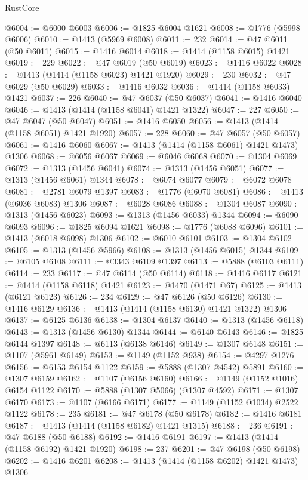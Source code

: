 \begin{lexlean}{RustCore}
\begin{coremodule}
@6004 := @6000 @6003
@6006 := @1825 @6004 @1621
@6008 := @1776 (@5998 @6006)
@6010 := @1413 (@5969 @6008)
@6011 := 232
@6014 := @47 @6011 (@50 @6011)
@6015 := @1416 @6014
@6018 := @1414 (@1158 @6015) @1421
@6019 := 229
@6022 := @47 @6019 (@50 @6019)
@6023 := @1416 @6022
@6028 := @1413 (@1414 (@1158 @6023) @1421 @1920)
@6029 := 230
@6032 := @47 @6029 (@50 @6029)
@6033 := @1416 @6032
@6036 := @1414 (@1158 @6033) @1421
@6037 := 226
@6040 := @47 @6037 (@50 @6037)
@6041 := @1416 @6040
@6046 := @1413 (@1414 (@1158 @6041) @1421 @1322)
@6047 := 227
@6050 := @47 @6047 (@50 @6047)
@6051 := @1416 @6050
@6056 := @1413 (@1414 (@1158 @6051) @1421 @1920)
@6057 := 228
@6060 := @47 @6057 (@50 @6057)
@6061 := @1416 @6060
@6067 := @1413 (@1414 (@1158 @6061) @1421 @1473) @1306
@6068 := @6056 @6067
@6069 := @6046 @6068
@6070 := @1304 @6069
@6072 := @1313 (@1456 @6041)
@6074 := @1313 (@1456 @6051)
@6077 := @1313 (@1456 @6061) @1344
@6078 := @6074 @6077
@6079 := @6072 @6078
@6081 := @2781 @6079 @1397
@6083 := @1776 (@6070 @6081)
@6086 := @1413 (@6036 @6083) @1306
@6087 := @6028 @6086
@6088 := @1304 @6087
@6090 := @1313 (@1456 @6023)
@6093 := @1313 (@1456 @6033) @1344
@6094 := @6090 @6093
@6096 := @1825 @6094 @1621
@6098 := @1776 (@6088 @6096)
@6101 := @1413 (@6018 @6098) @1306
@6102 := @6010 @6101
@6103 := @1304 @6102
@6105 := @1313 (@1456 @5966)
@6108 := @1313 (@1456 @6015) @1344
@6109 := @6105 @6108
@6111 := @3343 @6109 @1397
@6113 := @5888 (@6103 @6111)
@6114 := 233
@6117 := @47 @6114 (@50 @6114)
@6118 := @1416 @6117
@6121 := @1414 (@1158 @6118) @1421
@6123 := @1470 (@1471 @67)
@6125 := @1413 (@6121 @6123)
@6126 := 234
@6129 := @47 @6126 (@50 @6126)
@6130 := @1416 @6129
@6136 := @1413 (@1414 (@1158 @6130) @1421 @1322) @1306
@6137 := @6125 @6136
@6138 := @1304 @6137
@6140 := @1313 (@1456 @6118)
@6143 := @1313 (@1456 @6130) @1344
@6144 := @6140 @6143
@6146 := @1825 @6144 @1397
@6148 := @6113 (@6138 @6146)
@6149 := @1307 @6148
@6151 := @1107 (@5961 @6149)
@6153 := @1149 (@1152 @938)
@6154 := @4297 @1276
@6156 := @6153 @6154 @1122
@6159 := @5888 (@1307 @4542) @5891
@6160 := @1307 @6159
@6162 := @1107 (@6156 @6160)
@6166 := @1149 (@1152 @1016) @6154 @1122
@6170 := @5888 (@1307 @5066) (@1307 @4592)
@6171 := @1307 @6170
@6173 := @1107 (@6166 @6171)
@6177 := @1149 (@1152 @1034) @2522 @1122
@6178 := 235
@6181 := @47 @6178 (@50 @6178)
@6182 := @1416 @6181
@6187 := @1413 (@1414 (@1158 @6182) @1421 @1315)
@6188 := 236
@6191 := @47 @6188 (@50 @6188)
@6192 := @1416 @6191
@6197 := @1413 (@1414 (@1158 @6192) @1421 @1920)
@6198 := 237
@6201 := @47 @6198 (@50 @6198)
@6202 := @1416 @6201
@6208 := @1413 (@1414 (@1158 @6202) @1421 @1473) @1306

\end{coremodule}
\end{lexlean}
